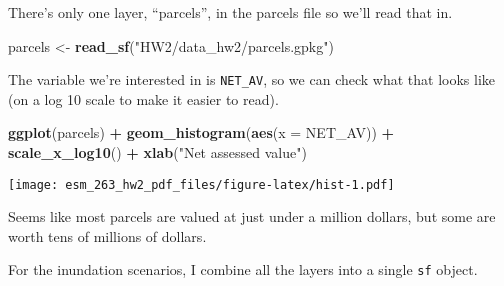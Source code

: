 \documentclass[
]{article}
\newenvironment{Shaded}{\begin{snugshade}}{\end{snugshade}}
\newcommand{\CommentTok}[1]{\textcolor[rgb]{0.56,0.35,0.01}{\textit{#1}}}
\newcommand{\ControlFlowTok}[1]{\textcolor[rgb]{0.13,0.29,0.53}{\textbf{#1}}}
\newcommand{\DataTypeTok}[1]{\textcolor[rgb]{0.13,0.29,0.53}{#1}}
\newcommand{\DecValTok}[1]{\textcolor[rgb]{0.00,0.00,0.81}{#1}}
\newcommand{\KeywordTok}[1]{\textcolor[rgb]{0.13,0.29,0.53}{\textbf{#1}}}
\newcommand{\NormalTok}[1]{#1}
\newcommand{\OperatorTok}[1]{\textcolor[rgb]{0.81,0.36,0.00}{\textbf{#1}}}
\newcommand{\OtherTok}[1]{\textcolor[rgb]{0.56,0.35,0.01}{#1}}
\newcommand{\StringTok}[1]{\textcolor[rgb]{0.31,0.60,0.02}{#1}}
\begin{document}
There's only one layer, ``parcels'', in the parcels file so we'll read
that in.

\begin{Shaded}
\begin{Highlighting}[]
\NormalTok{parcels <-}\StringTok{ }\KeywordTok{read_sf}\NormalTok{(}\StringTok{"HW2/data_hw2/parcels.gpkg"}\NormalTok{)}
\end{Highlighting}
\end{Shaded}

The variable we're interested in is \texttt{NET\_AV}, so we can check
what that looks like (on a log 10 scale to make it easier to read).

\begin{Shaded}
\begin{Highlighting}[]
\KeywordTok{ggplot}\NormalTok{(parcels) }\OperatorTok{+}
\StringTok{  }\KeywordTok{geom_histogram}\NormalTok{(}\KeywordTok{aes}\NormalTok{(}\DataTypeTok{x =}\NormalTok{ NET_AV)) }\OperatorTok{+}
\StringTok{  }\KeywordTok{scale_x_log10}\NormalTok{() }\OperatorTok{+}
\StringTok{  }\KeywordTok{xlab}\NormalTok{(}\StringTok{"Net assessed value"}\NormalTok{)}
\end{Highlighting}
\end{Shaded}

\texttt{[image: esm\_263\_hw2\_pdf\_files/figure-latex/hist-1.pdf]}

Seems like most parcels are valued at just under a million dollars, but
some are worth tens of millions of dollars.

For the inundation scenarios, I combine all the layers into a single
\texttt{sf} object.

\begin{Shaded}
\end{Shaded}
\end{document}
